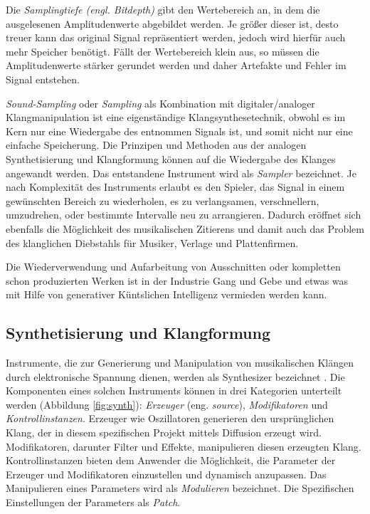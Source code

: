 \documentclass[
  a4paper,  %
  twoside,  %
  bibliography=totoc,
  headsepline,
  cleardoublepage=empty,
  parskip=half,
  draft=false
]{scrbook}
\begin{document}
Die \emph{Samplingtiefe (engl. Bitdepth)} gibt den Wertebereich an, in dem die ausgelesenen Amplitudenwerte abgebildet werden. Je größer dieser ist, desto treuer kann das original Signal repräsentiert werden, jedoch wird hierfür auch mehr Speicher benötigt. Fällt der Wertebereich klein aus, so müssen die Amplitudenwerte stärker gerundet werden und daher Artefakte und Fehler im Signal entstehen. \cite{thompson_understanding_2005}

\emph{Sound-Sampling} oder \emph{Sampling} als Kombination mit digitaler/analoger Klangmanipulation ist eine eigenständige Klangsynthesetechnik, obwohl es im Kern nur eine Wiedergabe des entnommen Signals ist, und somit nicht nur eine einfache Speicherung. Die Prinzipen und Methoden aus der analogen Synthetisierung und Klangformung können auf die Wiedergabe des Klanges angewandt werden. Das entstandene Instrument wird als \emph{Sampler} bezeichnet. Je nach Komplexität des Instruments erlaubt es den Spieler, das Signal in einem gewünschten Bereich zu wiederholen, es zu verlangsamen, verschnellern, umzudrehen, oder bestimmte Intervalle neu zu arrangieren. Dadurch eröffnet sich ebenfalls die Möglichkeit des musikalischen Zitierens und damit auch das Problem des klanglichen Diebstahls für Musiker, Verlage und Plattenfirmen. \cite{russ_sound_2009, ruschkowski_elektronische_2019, katz_capturing_2010} 

Die Wiederverwendung und Aufarbeitung von Ausschnitten oder kompletten schon produzierten Werken ist in der Industrie Gang und Gebe und etwas was mit Hilfe von generativer Küntslichen Intelligenz vermieden werden kann. 

\subsection{Synthetisierung und Klangformung} \label{sec:synth+envelope}

Instrumente, die zur Generierung und Manipulation von musikalischen Klängen durch elektronische Spannung dienen, werden als Synthesizer bezeichnet \cite{dudenredaktion_synthesizer_nodate, pirkle_designing_2021}. Die Komponenten eines solchen Instruments können in drei Kategorien unterteilt werden (Abbildung \ref{fig:synth}): \emph{Erzeuger} (eng. \emph{source}), \emph{Modifikatoren} und \emph{Kontrollinstanzen}. Erzeuger wie Oszillatoren generieren den ursprünglichen Klang, der in diesem spezifischen Projekt mittels Diffusion erzeugt wird. Modifikatoren, darunter Filter und Effekte, manipulieren diesen erzeugten Klang. Kontrollinstanzen bieten dem Anwender die Möglichkeit, die Parameter der Erzeuger und Modifikatoren einzustellen und dynamisch anzupassen. Das Manipulieren eines Parameters wird als \emph{Modulieren} bezeichnet. Die Spezifischen Einstellungen der Parameters als \emph{Patch}. \cite{pirkle_designing_2021}   
\end{document}
